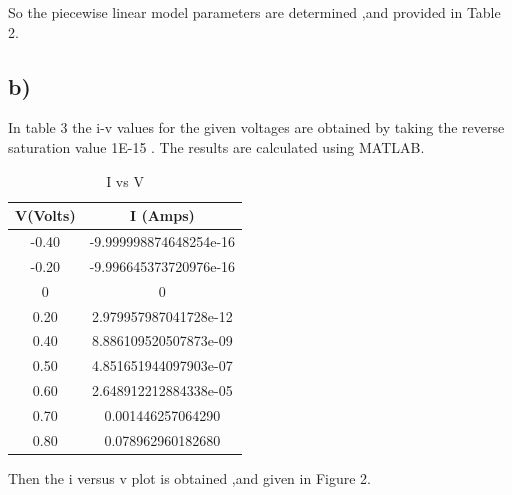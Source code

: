 \documentclass[letterpaper,12pt]{article}
\begin{document}
So the piecewise linear model parameters are determined ,and provided in Table 2.

    
    
\subsection{b)}
In table 3 the i-v values for the given voltages are obtained by taking the reverse saturation value 1E-15 . The results are calculated using MATLAB.

\begin{table}[H]
\begin{center}
\caption{ I vs V}
\vspace{2mm}
\begin{tabular}{||c | c ||} 
\hline
V(Volts) & I (Amps) \\ [0.5ex] 
\hline\hline
-0.40 & -9.999998874648254e-16  \\ 
\hline
-0.20 & -9.996645373720976e-16  \\ 
\hline
0 & 0  \\ 
\hline
0.20 & 2.979957987041728e-12  \\ 
\hline
0.40 & 8.886109520507873e-09  \\ 

\hline
0.50 & 4.851651944097903e-07  \\ 
\hline
0.60 & 2.648912212884338e-05  \\ 
\hline
0.70 & 0.001446257064290  \\ 
\hline
0.80 & 0.078962960182680  \\ 
\hline
\end{tabular}
\end{center}
\end{table}

Then the i versus v plot is obtained ,and given in Figure 2.
\end{document}
